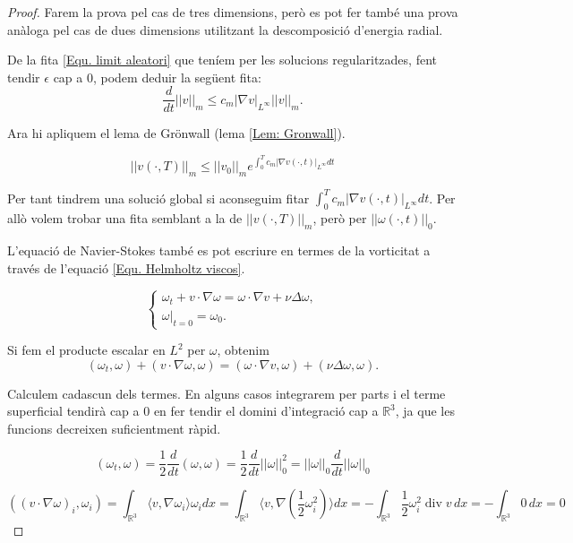 \documentclass{article}
\numberwithin{equation}{section}
\DeclareMathOperator{\diver}{div}
\begin{document}
\begin{proof}
Farem la prova pel cas de tres dimensions, per\`{o} es pot fer tamb\'{e} una prova an\`{a}loga pel cas de dues dimensions utilitzant la descomposici\'{o} d'energia radial.

De la fita \eqref{Equ. limit aleatori} que ten\'{i}em per les solucions regularitzades, fent tendir $\epsilon$ cap a $0$, podem deduir la seg\"{u}ent fita:
\[\frac{d}{dt}||v||_m\leq c_m|\nabla v|_{L^{\infty}}||v||_m.\]

Ara hi apliquem el lema de Gr\"{o}nwall (lema \ref{Lem: Gronwall}).

\begin{equation}\label{Equ. limit velocitat Gronwall}
||v(\cdot,T)||_m\leq||v_0||_me^{\int_0^Tc_m|\nabla v(\cdot,t)|_{L^{\infty}}dt}
\end{equation}

Per tant tindrem una soluci\'{o} global si aconseguim fitar $\int_0^Tc_m|\nabla v(\cdot,t)|_{L^{\infty}}dt$. Per all\`{o} volem trobar una fita semblant a la de $||v(\cdot,T)||_m$, per\`{o} per $||\omega(\cdot,t)||_0$.

L'equaci\'{o} de Navier-Stokes tamb\'{e} es pot escriure en termes de la vorticitat a trav\'{e}s de l'equaci\'{o} \eqref{Equ. Helmholtz viscos}.

\begin{equation}
\left\{\begin{array}{l}\omega_t+v\cdot\nabla\omega=\omega\cdot\nabla v+\nu\Delta\omega,\\\omega|_{t=0}=\omega_0.\end{array}\right.
\end{equation}

Si fem el producte escalar en $L^2$ per $\omega$, obtenim
\[(\omega_t,\omega)+(v\cdot\nabla\omega,\omega)=(\omega\cdot\nabla v,\omega)+(\nu\Delta\omega,\omega).\]

Calculem cadascun dels termes. En alguns casos integrarem per parts i el terme superficial tendir\`{a} cap a $0$ en fer tendir el domini d'integraci\'{o} cap a $\mathbb{R}^3$, ja que les funcions decreixen suficientment r\`{a}pid.

\[(\omega_t,\omega)=\frac{1}{2}\frac{d}{dt}(\omega,\omega)=\frac{1}{2}\frac{d}{dt}||\omega||_0^2=||\omega||_0\frac{d}{dt}||\omega||_0\]

\[((v\cdot\nabla\omega)_i,\omega_i)=\int_{\mathbb{R}^3}\langle v,\nabla\omega_i\rangle\omega_idx=\int_{\mathbb{R}^3}\langle v,\nabla\left(\frac{1}{2}\omega_i^2\right)\rangle dx=-\int_{\mathbb{R}^3}\frac{1}{2}\omega_i^2\diver v\,dx=-\int_{\mathbb{R}^3}0\,dx=0\]


\end{proof}
\end{document}
